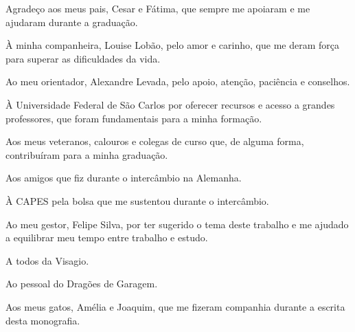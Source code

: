 \begin{agradecimentos}
    Agradeço aos meus pais, Cesar e Fátima, que sempre me apoiaram e me ajudaram durante a graduação.
    
    À minha companheira, Louise Lobão, pelo amor e carinho, que me deram força para superar as dificuldades da vida.
    
    Ao meu orientador, Alexandre Levada, pelo apoio, atenção, paciência e conselhos.
    
    À Universidade Federal de São Carlos por oferecer recursos e acesso a grandes professores, que foram fundamentais para a minha formação.
    
    Aos meus veteranos, calouros e colegas de curso que, de alguma forma, contribuíram para a minha graduação.
    
    Aos amigos que fiz durante o intercâmbio na Alemanha.
    
    À CAPES pela bolsa que me sustentou durante o intercâmbio.
    
    Ao meu gestor, Felipe Silva, por ter sugerido o tema deste trabalho e me ajudado a equilibrar meu tempo entre trabalho e estudo.
    
    A todos da Visagio.
    
    Ao pessoal do Dragões de Garagem.

    Aos meus gatos, Amélia e Joaquim, que me fizeram companhia durante a escrita desta monografia.

\end{agradecimentos}

